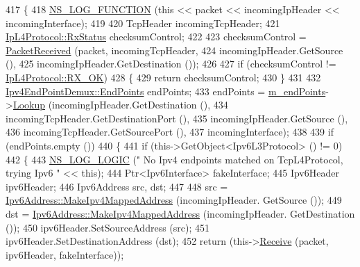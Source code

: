 \begin{DoxyCode}
417 \{
418   \hyperlink{log-macros-disabled_8h_a90b90d5bad1f39cb1b64923ea94c0761}{NS\_LOG\_FUNCTION} (\textcolor{keyword}{this} << packet << incomingIpHeader << incomingInterface);
419 
420   TcpHeader incomingTcpHeader;
421   \hyperlink{classns3_1_1IpL4Protocol_afd3744c89902fff232e2fd45f558c80e}{IpL4Protocol::RxStatus} checksumControl;
422 
423   checksumControl = \hyperlink{classns3_1_1TcpL4Protocol_a3ff49ecbf02516282f7b8158819f432b}{PacketReceived} (packet, incomingTcpHeader,
424                                     incomingIpHeader.GetSource (),
425                                     incomingIpHeader.GetDestination ());
426 
427   \textcolor{keywordflow}{if} (checksumControl != \hyperlink{classns3_1_1IpL4Protocol_afd3744c89902fff232e2fd45f558c80eabd979bce2f3b22521c81c4115c66317e}{IpL4Protocol::RX\_OK})
428     \{
429       \textcolor{keywordflow}{return} checksumControl;
430     \}
431 
432   \hyperlink{classns3_1_1Ipv4EndPointDemux_a506a9661c08e2a64dab09ad6613d3b45}{Ipv4EndPointDemux::EndPoints} endPoints;
433   endPoints = \hyperlink{classns3_1_1TcpL4Protocol_a7ca53708bd7d91191af64a290095ebe7}{m\_endPoints}->\hyperlink{classns3_1_1Ipv4EndPointDemux_acd458004b74ea330e9025ab874f2c1b1}{Lookup} (incomingIpHeader.GetDestination (),
434                                    incomingTcpHeader.GetDestinationPort (),
435                                    incomingIpHeader.GetSource (),
436                                    incomingTcpHeader.GetSourcePort (),
437                                    incomingInterface);
438 
439   \textcolor{keywordflow}{if} (endPoints.empty ())
440     \{
441       \textcolor{keywordflow}{if} (this->GetObject<Ipv6L3Protocol> () != 0)
442         \{
443           \hyperlink{group__logging_ga88acd260151caf2db9c0fc84997f45ce}{NS\_LOG\_LOGIC} (\textcolor{stringliteral}{"  No Ipv4 endpoints matched on TcpL4Protocol, trying Ipv6 "} << \textcolor{keyword}{this});
444           Ptr<Ipv6Interface> fakeInterface;
445           Ipv6Header ipv6Header;
446           Ipv6Address src, dst;
447 
448           src = \hyperlink{classns3_1_1Ipv6Address_ae2db372827002d9791dec4edb6925021}{Ipv6Address::MakeIpv4MappedAddress} (incomingIpHeader.
      GetSource ());
449           dst = \hyperlink{classns3_1_1Ipv6Address_ae2db372827002d9791dec4edb6925021}{Ipv6Address::MakeIpv4MappedAddress} (incomingIpHeader.
      GetDestination ());
450           ipv6Header.SetSourceAddress (src);
451           ipv6Header.SetDestinationAddress (dst);
452           \textcolor{keywordflow}{return} (this->\hyperlink{classns3_1_1TcpL4Protocol_a73a9498522829954684a7b4fabd6bf3e}{Receive} (packet, ipv6Header, fakeInterface));

\end{DoxyCode}
